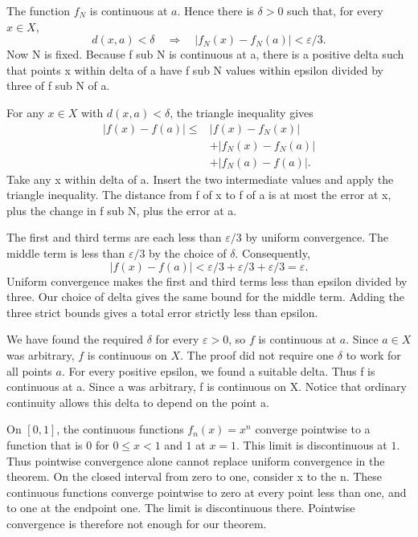 \documentclass{article}
\begin{document}
{The function $f_N$ is continuous at $a$. Hence there is $\delta>0$ such that, for every $x\in X$,
\[d(x,a)<\delta\quad\Longrightarrow\quad |f_N(x)-f_N(a)|<\varepsilon/3.\]}
{Now N is fixed. Because f sub N is continuous at a, there is a positive delta such that points x within delta of a have f sub N values within epsilon divided by three of f sub N of a.}

{For any $x\in X$ with $d(x,a)<\delta$, the triangle inequality gives
\[\begin{aligned}|f(x)-f(a)|\le{}&|f(x)-f_N(x)|\\&+|f_N(x)-f_N(a)|\\&+|f_N(a)-f(a)|.\end{aligned}\]}
{Take any x within delta of a. Insert the two intermediate values and apply the triangle inequality. The distance from f of x to f of a is at most the error at x, plus the change in f sub N, plus the error at a.}

{The first and third terms are each less than $\varepsilon/3$ by uniform convergence. The middle term is less than $\varepsilon/3$ by the choice of $\delta$. Consequently,
\[|f(x)-f(a)|<\varepsilon/3+\varepsilon/3+\varepsilon/3=\varepsilon.\]}
{Uniform convergence makes the first and third terms less than epsilon divided by three. Our choice of delta gives the same bound for the middle term. Adding the three strict bounds gives a total error strictly less than epsilon.}

{We have found the required $\delta$ for every $\varepsilon>0$, so $f$ is continuous at $a$. Since $a\in X$ was arbitrary, $f$ is continuous on $X$. The proof did not require one $\delta$ to work for all points $a$.}
{For every positive epsilon, we found a suitable delta. Thus f is continuous at a. Since a was arbitrary, f is continuous on X. Notice that ordinary continuity allows this delta to depend on the point a.}

{On $[0,1]$, the continuous functions $f_n(x)=x^n$ converge pointwise to a function that is $0$ for $0\le x<1$ and $1$ at $x=1$. This limit is discontinuous at $1$. Thus pointwise convergence alone cannot replace uniform convergence in the theorem.}
{On the closed interval from zero to one, consider x to the n. These continuous functions converge pointwise to zero at every point less than one, and to one at the endpoint one. The limit is discontinuous there. Pointwise convergence is therefore not enough for our theorem.}
\end{document}
